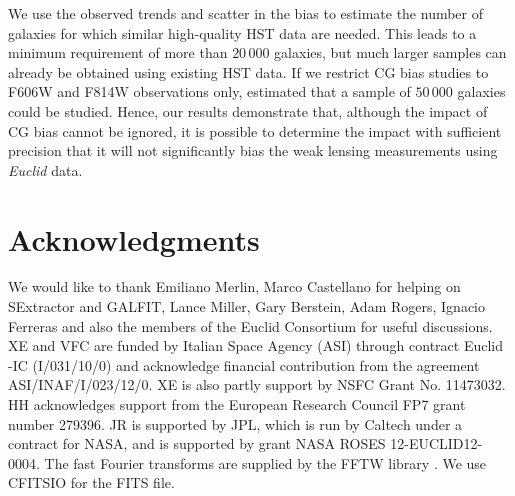 \documentclass[useAMS,usenatbib]{mnras}
\begin{document}
We use the observed trends and scatter in the bias to estimate the number of galaxies for which similar high-quality HST data are needed. This leads to a minimum requirement of more than $20\,000$ galaxies,
but much larger samples can already be obtained using existing HST data. If we restrict CG bias studies to F606W and F814W observations only,  estimated that a sample of $50\,000$ galaxies could be studied. Hence, our results demonstrate that, although the impact of CG bias cannot be ignored, it is possible to determine the impact with sufficient precision that it will not significantly bias the weak lensing measurements using {\it Euclid} data.

\section*{Acknowledgments}

We would like to thank Emiliano Merlin, Marco Castellano for helping
on {\sc SExtractor} and {\sc GALFIT}, Lance Miller, Gary Berstein, Adam Rogers, 
Ignacio Ferreras and also
the members of the Euclid Consortium for useful discussions. XE and VFC
are funded by Italian Space Agency (ASI) through contract Euclid -IC (I/031/10/0) and
acknowledge financial contribution from the agreement ASI/INAF/I/023/12/0. XE is also partly
support by NSFC Grant No. 11473032. HH acknowledges support from the European
Research Council FP7 grant number 279396. JR is supported by JPL, which is
run by Caltech under a contract for NASA, and is supported by grant
NASA ROSES 12-EUCLID12- 0004. The fast Fourier transforms are supplied
by the FFTW library \citep{fftw05}. We use CFITSIO
\citep{1999ASPC..172..487P} for the FITS file.



\end{document}
